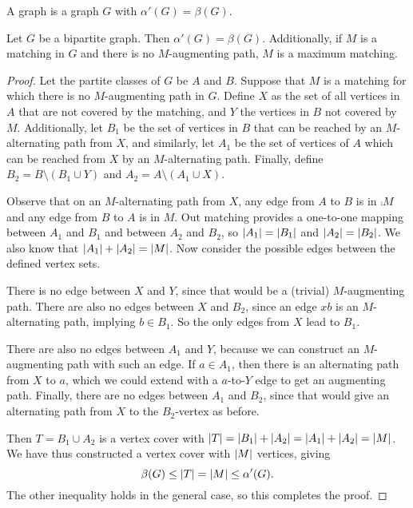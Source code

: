 
\begin{definition}
  A  graph is a graph $G$ with $\alpha'(G) = \beta(G)$.
\end{definition}

\begin{theorem}[König]
  Let $G$ be a bipartite graph.
  Then $\alpha'(G) = \beta(G)$.
  Additionally, if $M$ is a matching in $G$ and there is no $M$-augmenting
  path, $M$ is a maximum matching.
\end{theorem}

\begin{proof}
  Let the partite classes of $G$ be $A$ and $B$.
  Suppose that $M$ is a matching for which there is no $M$-augmenting path in
  $G$.
  Define $X$ as the set of all vertices in $A$ that are not covered by the
  matching, and $Y$ the vertices in $B$ not covered by $M$.
  Additionally, let $B_1$ be the set of vertices in $B$ that can be reached by
  an $M$-alternating path from $X$, and similarly, let $A_1$ be the set of
  vertices of $A$ which can be reached from $X$ by an $M$-alternating path.
  Finally, define $B_2 = B \setminus (B_1 \cup Y)$ and $A_2 = A \setminus (A_1
  \cup X)$.

  Observe that on an $M$-alternating path from $X$, any edge from $A$ to $B$ is
  in $\comp{M}$ and any edge from $B$ to $A$ is in $M$.
  Out matching provides a one-to-one mapping between $A_1$ and $B_1$ and between
  $A_2$ and $B_2$, so $\left| A_1 \right| = \left| B_1 \right|$ and $\left| A_2 \right| = \left| B_2 \right|$.
  We also know that $\left| A_1 \right| + \left| A_2 \right| = \left| M \right|$.
  Now consider the possible edges between the defined vertex sets.

  There is no edge between $X$ and $Y$, since that would be a (trivial)
  $M$-augmenting path.
  There are also no edges between $X$ and $B_2$, since an edge $xb$ is an
  $M$-alternating path, implying $b \in B_1$.
  So the only edges from $X$ lead to $B_1$.

  There are also no edges between $A_1$ and $Y$, because we can construct an
  $M$-augmenting path with such an edge.
  If $a \in A_1$, then there is an alternating path from $X$ to $a$, which we
  could extend with a $a$-to-$Y$ edge to get an augmenting path.
  Finally, there are no edges between $A_1$ and $B_2$, since that would give an
  alternating path from $X$ to the $B_2$-vertex as before.

  Then $T = B_1 \cup A_2$ is a vertex cover with
  $\left| T \right| = \left| B_1 \right| + \left| A_2 \right| = \left| A_1 \right| + \left| A_2 \right| = \left| M \right|$.
  We have thus constructed a vertex cover with $\left| M \right|$ vertices, giving
  \[
	\beta(G) \le \left| T \right| = \left| M \right| \le \alpha'(G).
  \]
  The other inequality holds in the general case, so this completes the proof.
\end{proof}

